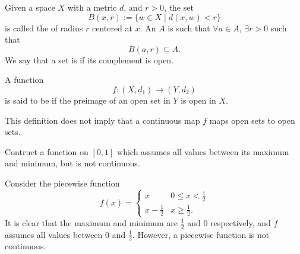\documentclass[notoc,notitlepage]{tufte-book}
\begin{document}
\begin{defn}\label{defn:open_and_closed_sets}
  Given a space $X$ with a metric $d$, and $r > 0$, the set
  \begin{equation*}
    B(x, r) := \{ w \in X \mid d(x, w) < r \}
  \end{equation*}
  is called the  of radius $r$ centered at $x$. An  $A$ is such that $\forall a \in A$, $\exists r > 0$ such that
  \begin{equation*}
    B(a, r) \subseteq A.
  \end{equation*}
  We say that a set is  if its complement is open.
\end{defn}

\begin{defn}\label{defn:continuous_map}
  A function
  \begin{equation*}
    f : (X, d_1) \to (Y, d_2)
  \end{equation*}
  is said to be  if the preimage of an open set in $Y$ is open in $X$.
\end{defn}

\begin{warning}
  This definition does not imply that a continuous map $f$ maps open sets to open sets.
\end{warning}

\begin{ex}
  Contruct a function on $[0, 1]$ which assumes all values between its maximum and minimum, but is not continuous.
\end{ex}

\begin{solution}
  Consider the piecewise function
  \begin{equation*}
    f(x) = \begin{cases}
      x & 0 \leq x < \frac{1}{2} \\
      x - \frac{1}{2} & x \geq \frac{1}{2}.
    \end{cases}
  \end{equation*}
  It is clear that the maximum and minimum are $\frac{1}{2}$ and $0$ respectively, and $f$ assumes all values between $0$ and $\frac{1}{2}$. However, a piecewise function is not continuous.
\end{solution}
\end{document}
